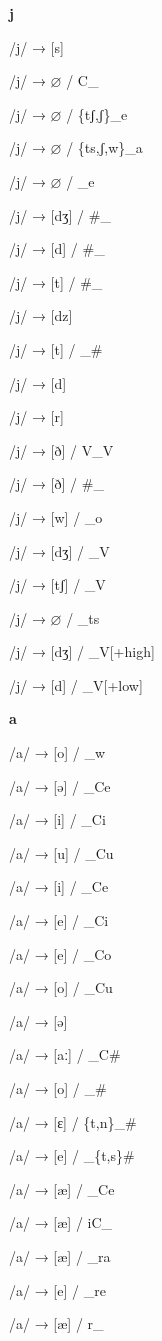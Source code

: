 \begin{center}\textbf{j}\end{center}
\begin{multicols}{4}
\noindent /j/ → [s]

\noindent /j/ → $\varnothing$ / C\_

\noindent /j/ → $\varnothing$ / \{tʃ,ʃ\}\_e

\noindent /j/ → $\varnothing$ / \{ts,ʃ,w\}\_a

\noindent /j/ → $\varnothing$ / \_e

\noindent /j/ → [dʒ] / \#\_

\noindent /j/ → [d] / \#\_

\noindent /j/ → [t] / \#\_

\noindent /j/ → [dz]

\noindent /j/ → [t] / \_\#

\noindent /j/ → [d]

\noindent /j/ → [r]

\noindent /j/ → [ð] / V\_V

\noindent /j/ → [ð] / \#\_

\noindent /j/ → [w] / \_o

\noindent /j/ → [dʒ] / \_V

\noindent /j/ → [tʃ] / \_V

\noindent /j/ → $\varnothing$ / \_ts

\noindent /j/ → [dʒ] / \_V[+high]

\noindent /j/ → [d] / \_V[+low]

\end{multicols}

\begin{center}\textbf{a}\end{center}
\begin{multicols}{4}
\noindent /a/ → [o] / \_w

\noindent /a/ → [ə] / \_Ce

\noindent /a/ → [i] / \_Ci

\noindent /a/ → [u] / \_Cu

\noindent /a/ → [i] / \_Ce

\noindent /a/ → [e] / \_Ci

\noindent /a/ → [e] / \_Co

\noindent /a/ → [o] / \_Cu

\noindent /a/ → [ə]

\noindent /a/ → [aː] / \_C\#

\noindent /a/ → [o] / \_\#

\noindent /a/ → [ɛ] / \{t,n\}\_\#

\noindent /a/ → [e] / \_\{t,s\}\#

\noindent /a/ → [æ] / \_Ce

\noindent /a/ → [æ] / iC\_

\noindent /a/ → [æ] / \_ra

\noindent /a/ → [e] / \_re

\noindent /a/ → [æ] / r\_
\end{multicols}


